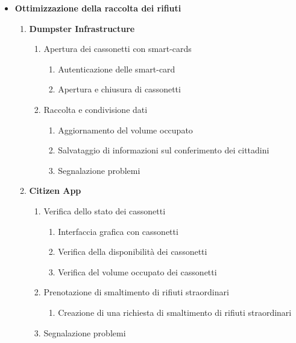 \begin{itemize}
    \item \textbf{Ottimizzazione della raccolta dei rifiuti}
    \begin{enumerate}[label*=\arabic*.]
        \item \textbf{Dumpster Infrastructure}
        \begin{enumerate}[label*=\arabic*.]
            \item Apertura dei cassonetti con smart-cards
            \begin{enumerate}[label*=\arabic*.]
                \item Autenticazione delle smart-card
                \item Apertura e chiusura di cassonetti
            \end{enumerate}
            \item Raccolta e condivisione dati
            \begin{enumerate}[label*=\arabic*.]
                \item Aggiornamento del volume occupato
                \item Salvataggio di informazioni sul conferimento dei cittadini
                \item Segnalazione problemi
            \end{enumerate}
        \end{enumerate}
        \item \textbf{Citizen App}
        \begin{enumerate}[label*=\arabic*.]
            \item Verifica dello stato dei cassonetti
            \begin{enumerate}[label*=\arabic*.]
                \item Interfaccia grafica con cassonetti
                \item Verifica della disponibilità dei cassonetti
                \item Verifica del volume occupato dei cassonetti
            \end{enumerate}
            \item Prenotazione di smaltimento di rifiuti straordinari
            \begin{enumerate}[label*=\arabic*.]
                \item Creazione di una richiesta di smaltimento di rifiuti straordinari
            \end{enumerate}
            \item Segnalazione problemi

\end{enumerate}
\end{enumerate}
\end{itemize}
